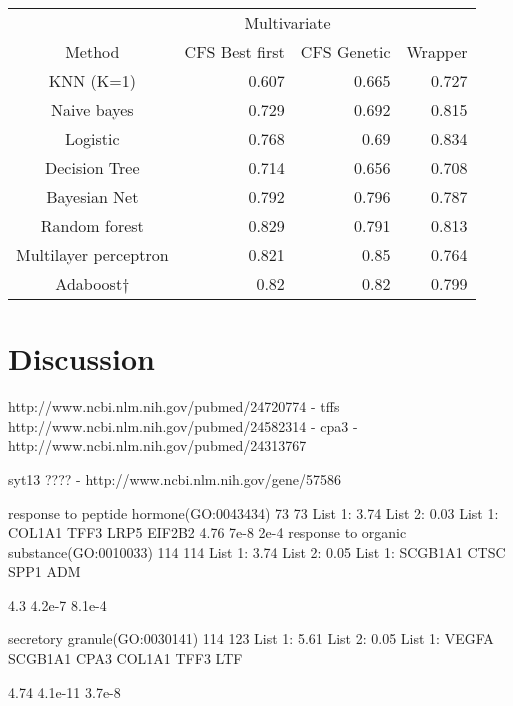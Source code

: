 \documentclass[conference,a4paper]{IEEEtran}
\begin{document}
\begin{table}[h]
	\caption{}
	\centering
	\begin{tabular}{c r r r}
		\hline\hline
		& \multicolumn{2}{c}{Multivariate} & \\
		Method & CFS Best first & CFS Genetic & Wrapper\\ [0.2ex]
		\hline
		KNN (K=1) & 0.607 & 0.665 & 0.727 \\
		Naive bayes & 0.729 & 0.692 & 0.815 \\
		Logistic & 0.768 & 0.69 & 0.834 \\
		Decision Tree & 0.714 & 0.656 & 0.708 \\
		Bayesian Net & 0.792 & 0.796 & 0.787 \\
		Random forest & 0.829 & 0.791 & 0.813\\
		Multilayer perceptron & 0.821 & 0.85 & 0.764\\
		Adaboost$\dagger$ & 0.82 & 0.82 & 0.799\\ [1ex]
		\hline
	\end{tabular}
	\label{table:filteredResults63142}
\end{table}


\section{Discussion}

http://www.ncbi.nlm.nih.gov/pubmed/24720774 - tffs
http://www.ncbi.nlm.nih.gov/pubmed/24582314 - cpa3 - http://www.ncbi.nlm.nih.gov/pubmed/24313767

syt13 ????  - http://www.ncbi.nlm.nih.gov/gene/57586

response to peptide hormone(GO:0043434)	73	73	List 1: 3.74%
List 2: 0.03%
List 1:
COL1A1
TFF3
LRP5
EIF2B2
4.76	7e-8	2e-4
response to organic substance(GO:0010033)	114	114	List 1: 3.74%
List 2: 0.05%
List 1:
SCGB1A1
CTSC
SPP1
ADM

4.3	4.2e-7	8.1e-4


secretory granule(GO:0030141)	114	123	List 1: 5.61%
List 2: 0.05%
List 1:
VEGFA
SCGB1A1
CPA3
COL1A1
TFF3
LTF

4.74	4.1e-11	3.7e-8


\end{document}
